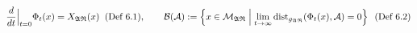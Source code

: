 \documentclass[preview]{standalone}
\begin{document}
\begin{align*}
\special{dvisvgm:raw <g id='unique000'>}\frac{d}{dt}\Big|_{t=0}\Phi_t(x) = X_{\mathfrak{AR}}(x)\;\;(\text{Def 6.1}), \qquad \mathcal{B}(\mathcal{A}) := \left\{x\in\mathcal{M}_{\mathfrak{AR}} \;\middle|\; \lim_{t\to\infty}\operatorname{dist}_{g_{\mathfrak{AR}}}(\Phi_t(x), \mathcal{A}) = 0\right\}\;\;(\text{Def 6.2})\special{dvisvgm:raw </g>}
\end{align*}
\end{document}
